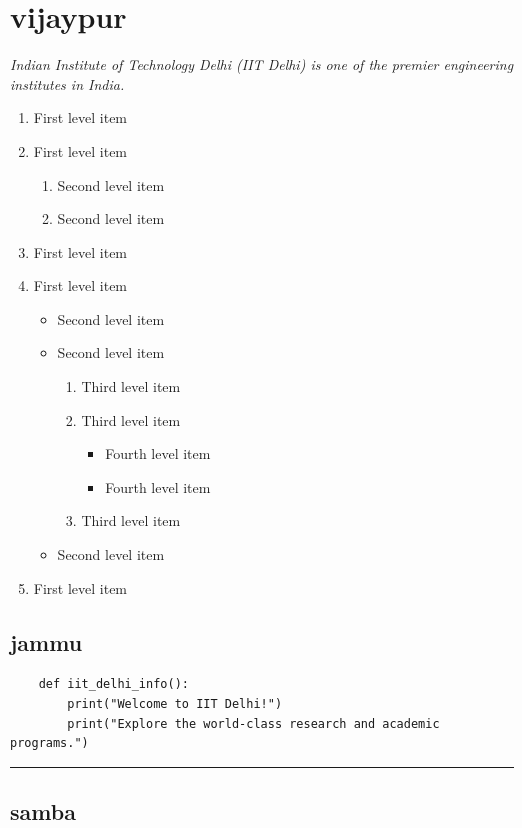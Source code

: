 \documentclass{article}
\begin{document}
\section{vijaypur}
\textit{Indian Institute of Technology Delhi (IIT Delhi) is one of the premier engineering institutes in India.}
\begin{enumerate}
    \item First level item
    \item First level item
    \begin{enumerate}
        \item Second level item
        \item Second level item
    \end{enumerate}
    \item First level item
    \item First level item
    \begin{itemize}
        \item Second level item
        \item Second level item
        \begin{enumerate}
            \item Third level item
            \item Third level item
            \begin{itemize}
              \item Fourth level item
              \item Fourth level item
            \end{itemize}
            \item Third level item
        \end{enumerate}
        \item Second level item
    \end{itemize}
    \item First level item
\end{enumerate}


\subsection{jammu}
\begin{verbatim}
    def iit_delhi_info():
        print("Welcome to IIT Delhi!")
        print("Explore the world-class research and academic programs.")
\end{verbatim}

\hrule

\subsection{samba}
\end{document}
